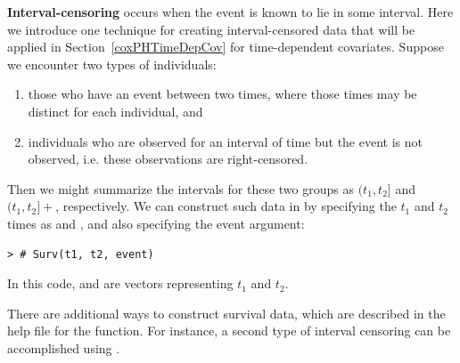 \documentclass[article]{jss}
\begin{document}
\textbf{Interval-censoring} occurs when the event is known to lie in some interval. Here we introduce one technique for creating interval-censored data that will be applied in Section~\ref{coxPHTimeDepCov} for time-dependent covariates. Suppose we encounter two types of individuals:
\begin{enumerate}
\item those who have an event between two times, where those times may be distinct for each individual, and
\item individuals who are observed for an interval of time but the event is not observed, i.e. these observations are right-censored.
\end{enumerate}
Then we might summarize the intervals for these two groups as $(t_1, t_2]$ and $(t_1, t_2]+$, respectively. We can construct such data in  by specifying the $t_1$ and $t_2$ times as  and , and also specifying the event argument:
\begin{verbatim}
> # Surv(t1, t2, event)
\end{verbatim}
In this code,  and  are vectors representing $t_1$ and $t_2$.


There are additional ways to construct survival data, which are described in the help file for the  function. For instance, a second type of interval censoring can be accomplished using .

\end{document}

